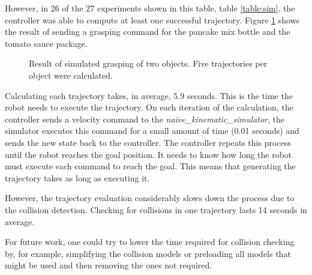 However, in 26 of the 27 experiments shown in this table, table \ref{table:sim}, the controller was able to compute at least one successful trajectory. Figure \ref{fig:traj_sim} shows the result of sending a grasping command for the pancake mix bottle and the tomato sauce package.

\begin{figure}[H]
	\centering
	\begin{subfigure}[]
		{\texttt{[image: sim\_result.png]}}
	\end{subfigure}
	\begin{subfigure}[]
		{\texttt{[image: sim\_result2.png]}}
	\end{subfigure}
	\vspace{-10pt}
	\caption[Simulated Trajectories]{Result of simulated grasping of two objects. Five trajectories per object were calculated.}
	\vspace{-15pt}
	\label{fig:traj_sim}
\end{figure}

Calculating each trajectory takes, in average, 5.9 seconds. This is the time the robot needs to execute the trajectory. On each iteration of the calculation, the controller sends a velocity command to the \textit{naive\_kinematic\_simulator}, the simulator executes this command for a small amount of time (0.01 seconds) and sends the new state back to the controller. The controller repeats this process until the robot reaches the goal position. It needs to know how long the robot must execute each command to reach the goal. This means that generating the trajectory takes as long as executing it.

However, the trajectory evaluation considerably slows down the process due to the collision detection. Checking for collisions in one trajectory lasts 14 seconds in average. 

For future work, one could try to lower the time required for collision checking by, for example, simplifying the collision models or preloading all models that might be used and then removing the ones not required.

